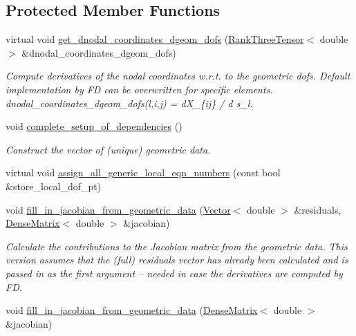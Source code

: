 \subsection*{Protected Member Functions}
\begin{DoxyCompactItemize}
\item 
virtual void \hyperlink{classoomph_1_1ElementWithMovingNodes_a639f9c0e3cf3a8173497011e8a496750}{get\+\_\+dnodal\+\_\+coordinates\+\_\+dgeom\+\_\+dofs} (\hyperlink{classoomph_1_1RankThreeTensor}{Rank\+Three\+Tensor}$<$ double $>$ \&dnodal\+\_\+coordinates\+\_\+dgeom\+\_\+dofs)
\begin{DoxyCompactList}\small\item\em Compute derivatives of the nodal coordinates w.\+r.\+t. to the geometric dofs. Default implementation by FD can be overwritten for specific elements. dnodal\+\_\+coordinates\+\_\+dgeom\+\_\+dofs(l,i,j) = d\+X\+\_\+\{ij\} / d s\+\_\+l. \end{DoxyCompactList}\item 
void \hyperlink{classoomph_1_1ElementWithMovingNodes_a6d2fa178f36d4b8413a9ce4f24e9c87e}{complete\+\_\+setup\+\_\+of\+\_\+dependencies} ()
\begin{DoxyCompactList}\small\item\em Construct the vector of (unique) geometric data. \end{DoxyCompactList}\item 
virtual void \hyperlink{classoomph_1_1ElementWithMovingNodes_a5fdaf955e508b80e5fd5673f574472d5}{assign\+\_\+all\+\_\+generic\+\_\+local\+\_\+eqn\+\_\+numbers} (const bool \&store\+\_\+local\+\_\+dof\+\_\+pt)
\item 
void \hyperlink{classoomph_1_1ElementWithMovingNodes_ad0f8a6ecdbc0e410fee8ae90f7464ded}{fill\+\_\+in\+\_\+jacobian\+\_\+from\+\_\+geometric\+\_\+data} (\hyperlink{classoomph_1_1Vector}{Vector}$<$ double $>$ \&residuals, \hyperlink{classoomph_1_1DenseMatrix}{Dense\+Matrix}$<$ double $>$ \&jacobian)
\begin{DoxyCompactList}\small\item\em Calculate the contributions to the Jacobian matrix from the geometric data. This version assumes that the (full) residuals vector has already been calculated and is passed in as the first argument -- needed in case the derivatives are computed by FD. \end{DoxyCompactList}\item 
void \hyperlink{classoomph_1_1ElementWithMovingNodes_ac9750cea96c52b31fe059ba109fea076}{fill\+\_\+in\+\_\+jacobian\+\_\+from\+\_\+geometric\+\_\+data} (\hyperlink{classoomph_1_1DenseMatrix}{Dense\+Matrix}$<$ double $>$ \&jacobian)
\end{DoxyCompactItemize}
